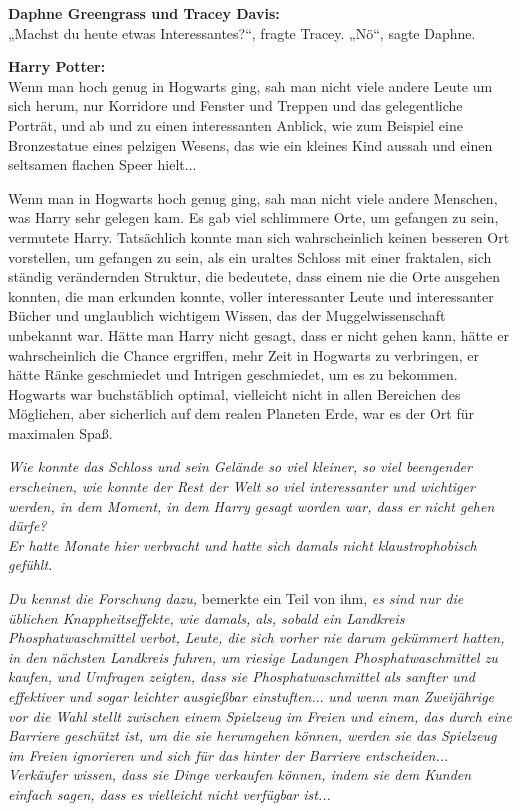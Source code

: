 {\textbf{Daphne Greengrass und Tracey Davis:}\\ „Machst du heute etwas Interessantes?“, fragte Tracey. „Nö“, sagte Daphne.

\textbf{Harry Potter:}\\ Wenn man hoch genug in Hogwarts ging, sah man nicht viele andere Leute um sich herum, nur Korridore und Fenster und Treppen und das gelegentliche Porträt, und ab und zu einen interessanten Anblick, wie zum Beispiel eine Bronzestatue eines pelzigen Wesens, das wie ein kleines Kind aussah und einen seltsamen flachen Speer hielt...

Wenn man in Hogwarts hoch genug ging, sah man nicht viele andere Menschen, was Harry sehr gelegen kam. Es gab viel schlimmere Orte, um gefangen zu sein, vermutete Harry. Tatsächlich konnte man sich wahrscheinlich keinen besseren Ort vorstellen, um gefangen zu sein, als ein uraltes Schloss mit einer fraktalen, sich ständig verändernden Struktur, die bedeutete, dass einem nie die Orte ausgehen konnten, die man erkunden konnte, voller interessanter Leute und interessanter Bücher und unglaublich wichtigem Wissen, das der Muggelwissenschaft unbekannt war. Hätte man Harry nicht gesagt, dass er nicht gehen kann, hätte er wahrscheinlich die Chance ergriffen, mehr Zeit in Hogwarts zu verbringen, er hätte Ränke geschmiedet und Intrigen geschmiedet, um es zu bekommen. Hogwarts war buchstäblich optimal, vielleicht nicht in allen Bereichen des Möglichen, aber sicherlich auf dem realen Planeten Erde, war es der Ort für maximalen Spaß.

\emph{Wie konnte das Schloss und sein Gelände so viel kleiner, so viel beengender erscheinen, wie konnte der Rest der Welt so viel interessanter und wichtiger werden, in dem Moment, in dem Harry gesagt worden war, dass er nicht gehen dürfe?}\\ \emph{Er hatte Monate hier verbracht und hatte sich damals nicht klaustrophobisch gefühlt.}

\emph{Du kennst die Forschung dazu,} bemerkte ein Teil von ihm, \emph{es sind nur die üblichen Knappheitseffekte, wie damals, als, sobald ein Landkreis Phosphatwaschmittel} \emph{verbot, Leute, die sich vorher nie darum gekümmert hatten, in den nächsten Landkreis fuhren, um riesige Ladungen Phosphatwaschmittel zu kaufen, und Umfragen zeigten, dass sie Phosphatwaschmittel als sanfter und effektiver und sogar leichter ausgießbar einstuften.}.. \emph{und wenn man Zweijährige vor die Wahl stellt zwischen einem Spielzeug im Freien und einem, das durch eine Barriere geschützt ist, um die sie herumgehen können, werden sie das Spielzeug im Freien ignorieren und sich für das hinter der Barriere entscheiden... Verkäufer wissen, dass sie Dinge verkaufen können, indem sie dem Kunden einfach sagen, dass es vielleicht nicht verfügbar ist...}

}
